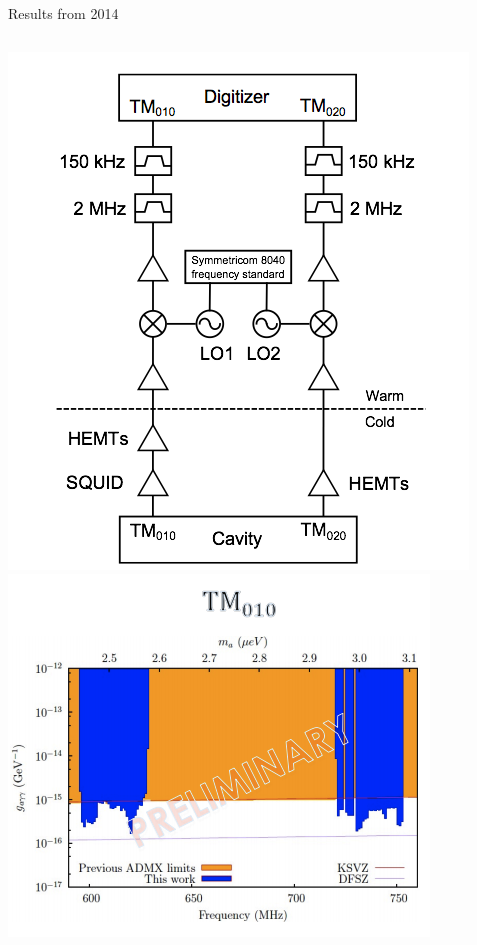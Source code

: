 \documentclass{beamer}
\begin{document}
\begin{frame}{Results from 2014}
\begin{columns}
\includegraphics[width=\textwidth]{two_channel_diagram}
\includegraphics[width=.9\textwidth]{2014_results_1}


\end{columns}
\end{frame}
\end{document}
